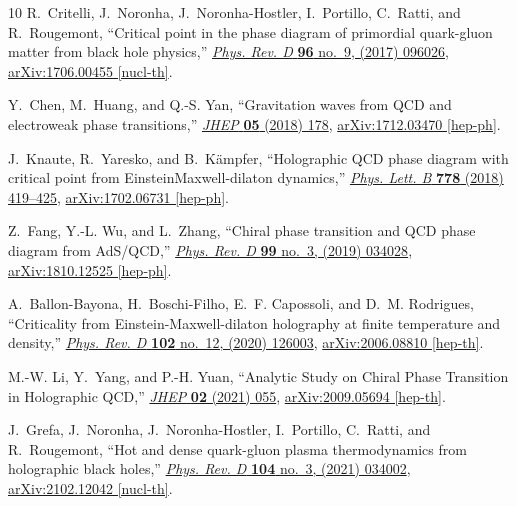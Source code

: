 \documentclass[a4paper,12pt]{article}
\numberwithin{equation}{section}
\begin{document}
\begin{thebibliography}{10}
	R.~Critelli, J.~Noronha, J.~Noronha-Hostler, I.~Portillo, C.~Ratti, and
	R.~Rougemont, ``{Critical point in the phase diagram of primordial
		quark-gluon matter from black hole physics},''
	\href{http://dx.doi.org/10.1103/PhysRevD.96.096026}{{\em Phys. Rev. D}
		{\bfseries 96} no.~9, (2017) 096026},
	\href{http://arxiv.org/abs/1706.00455}{{\ttfamily arXiv:1706.00455
			[nucl-th]}}.
	
	Y.~Chen, M.~Huang, and Q.-S. Yan, ``{Gravitation waves from QCD and electroweak
		phase transitions},'' \href{http://dx.doi.org/10.1007/JHEP05(2018)178}{{\em
			JHEP} {\bfseries 05} (2018) 178},
	\href{http://arxiv.org/abs/1712.03470}{{\ttfamily arXiv:1712.03470
			[hep-ph]}}.
	
	J.~Knaute, R.~Yaresko, and B.~K\"ampfer, ``{Holographic QCD phase diagram with
		critical point from Einstein\textendash{}Maxwell-dilaton dynamics},''
	\href{http://dx.doi.org/10.1016/j.physletb.2018.01.053}{{\em Phys. Lett. B}
		{\bfseries 778} (2018) 419--425},
	\href{http://arxiv.org/abs/1702.06731}{{\ttfamily arXiv:1702.06731
			[hep-ph]}}.
	
	Z.~Fang, Y.-L. Wu, and L.~Zhang, ``{Chiral phase transition and QCD phase
		diagram from AdS/QCD},''
	\href{http://dx.doi.org/10.1103/PhysRevD.99.034028}{{\em Phys. Rev. D}
		{\bfseries 99} no.~3, (2019) 034028},
	\href{http://arxiv.org/abs/1810.12525}{{\ttfamily arXiv:1810.12525
			[hep-ph]}}.
	
	A.~Ballon-Bayona, H.~Boschi-Filho, E.~F. Capossoli, and D.~M. Rodrigues,
	``{Criticality from Einstein-Maxwell-dilaton holography at finite temperature
		and density},'' \href{http://dx.doi.org/10.1103/PhysRevD.102.126003}{{\em
			Phys. Rev. D} {\bfseries 102} no.~12, (2020) 126003},
	\href{http://arxiv.org/abs/2006.08810}{{\ttfamily arXiv:2006.08810
			[hep-th]}}.
	
	M.-W. Li, Y.~Yang, and P.-H. Yuan, ``{Analytic Study on Chiral Phase Transition
		in Holographic QCD},'' \href{http://dx.doi.org/10.1007/JHEP02(2021)055}{{\em
			JHEP} {\bfseries 02} (2021) 055},
	\href{http://arxiv.org/abs/2009.05694}{{\ttfamily arXiv:2009.05694
			[hep-th]}}.
	
	J.~Grefa, J.~Noronha, J.~Noronha-Hostler, I.~Portillo, C.~Ratti, and
	R.~Rougemont, ``{Hot and dense quark-gluon plasma thermodynamics from
		holographic black holes},''
	\href{http://dx.doi.org/10.1103/PhysRevD.104.034002}{{\em Phys. Rev. D}
		{\bfseries 104} no.~3, (2021) 034002},
	\href{http://arxiv.org/abs/2102.12042}{{\ttfamily arXiv:2102.12042
			[nucl-th]}}.
	

\end{thebibliography}
\end{document}
